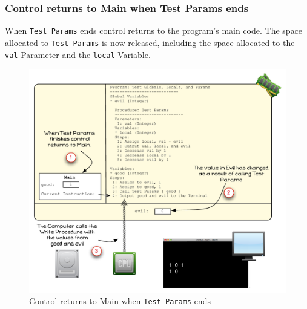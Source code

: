 \clearpage

\subsubsection{Control returns to Main when Test Params ends} %
\label{ssub:control_returns_to_main_when_test_params_ends}

When \texttt{Test Params} ends control returns to the program's main code. The space allocated to \texttt{Test Params} is now released, including the space allocated to the \texttt{val} Parameter and the \texttt{local} Variable.

\begin{figure}[htbp]
   \centering
   \includegraphics[width=\textwidth]{./topics/storing-using-data/images/vis-globals-6} 
   \caption{Control returns to Main when \texttt{Test Params} ends}
   \label{fig:vis-globals-6}
\end{figure}


